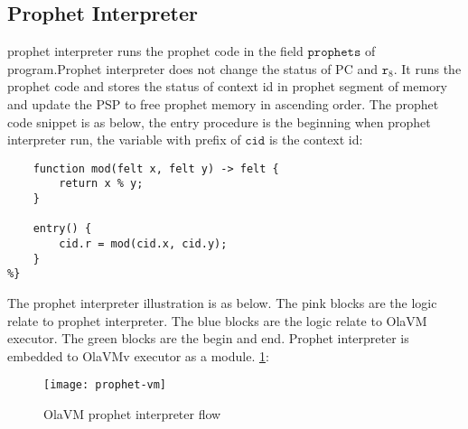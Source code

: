 \subsection{Prophet Interpreter}\label{subsec: prophet-interpreter}
prophet interpreter runs the prophet code in the field $\texttt{prophets}$ of program.Prophet interpreter does not change the status of PC and $\texttt{r}_{8}$.
It runs the prophet code and stores the status of context id in prophet segment of memory and update the PSP to free prophet memory in ascending order.
The prophet code snippet is as below, the entry procedure is the beginning when prophet interpreter run, the variable with prefix of $\texttt{cid}$ is the context id:
\begin{lstlisting}[label={lst:prophet-demo}]
%{
    function mod(felt x, felt y) -> felt {
        return x % y;
    }

    entry() {
        cid.r = mod(cid.x, cid.y);
    }
%}
\end{lstlisting}

The prophet interpreter illustration is as below.
The pink blocks are the logic relate to prophet interpreter.
The blue blocks are the logic relate to OlaVM executor.
The green blocks are the begin and end.
Prophet interpreter is embedded to OlaVMv executor as a module.
\ref{fig: prophet-interpreter-logic}:
\begin{figure}[!htp]
    \centering
    \texttt{[image: prophet-vm]}
    \caption{OlaVM prophet interpreter flow}
    \label{fig: prophet-interpreter-logic}
\end{figure}
